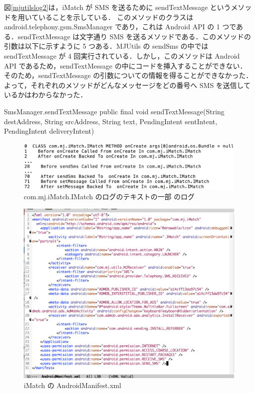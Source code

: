 図\ref{mjutilslog2}は，iMatch が SMS を送るために sendTextMessage というメソッドを用いていることを示している．
このメソッドのクラスは android.telephony.gsm.SmsManager であり，これは Android API の 1 つである\cite{smsmanager}．sendTextMessage は文字通り SMS を送るメソッドである．このメソッドの引数は以下に示すように 5 つある．MJUtils の sendSms の中では sendTextMessage が 4 回実行されている．しかし，このメソッドは Android API であるため，sendTextMessage の中にコードを挿入することができない．
そのため，sendTextMessage の引数についての情報を得ることができなかった．
よって，それぞれのメソッドがどんなメッセージをどの番号へ SMS を送信しているかはわからなかった．

\begin{itembox}[c]{SmsManager.sendTextMessage}
public final void sendTextMessage(String destAddress, String srcAddress, String text, PendingIntent sentIntent, PendingIntent deliveryIntent)
\end{itembox}

\begin{figure}[t]
\begin{center}
\graphicspath{{./epsfiles/}}
\includegraphics[scale=0.16]{logtext1.eps}
\end{center}
\caption{com.mj.iMatch.IMatch のログのテキストの一部 のログ}
\label{imatchlog}
\end{figure}


\begin{figure}[t]
\begin{center}
\graphicspath{{./epsfiles/}}
\includegraphics[scale=0.25]{imatchmanifest.eps}
\end{center}
\caption{iMatch の AndroidManifest.xml}
\label{imatchmanif}
\end{figure}


